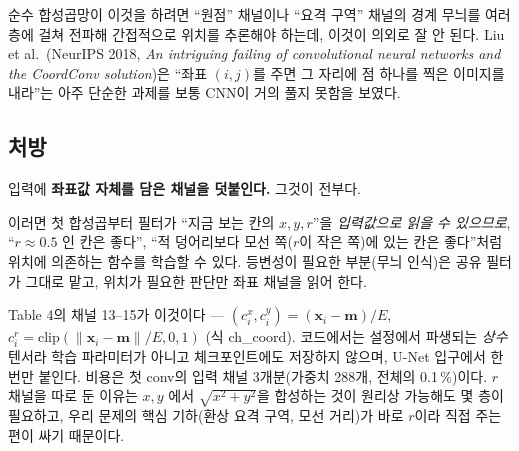 \documentclass[11pt]{article}
\begin{document}
순수 합성곱망이 이것을 하려면 ``원점'' 채널이나 ``요격 구역'' 채널의 경계 무늬를 여러 층에 걸쳐 전파해
간접적으로 위치를 추론해야 하는데, 이것이 의외로 잘 안 된다. Liu et al.\ (NeurIPS 2018, \emph{An intriguing
failing of convolutional neural networks and the CoordConv solution})은 ``좌표 $(i,j)$를 주면 그 자리에 점
하나를 찍은 이미지를 내라''는 아주 단순한 과제를 보통 CNN이 거의 풀지 못함을 보였다.

\subsection*{처방}
입력에 \textbf{좌표값 자체를 담은 채널을 덧붙인다.} 그것이 전부다.

\begin{center}
\end{center}

이러면 첫 합성곱부터 필터가 ``지금 보는 칸의 $x, y, r$''을 \emph{입력값으로 읽을 수 있으므로}, ``$r \approx 0.5$
인 칸은 좋다'', ``적 덩어리보다 모선 쪽($r$이 작은 쪽)에 있는 칸은 좋다''처럼 위치에 의존하는 함수를 학습할
수 있다. 등변성이 필요한 부분(무늬 인식)은 공유 필터가 그대로 맡고, 위치가 필요한 판단만 좌표 채널을
읽어 한다.

\begin{whybox}
Table 4의 채널 13--15가 이것이다 --- $(c^x_i, c^y_i) = (\mathbf{x}_i - \mathbf{m})/E$,
$c^r_i = \mathrm{clip}(\lVert \mathbf{x}_i - \mathbf{m}\rVert / E, 0, 1)$ (식 ch\_coord). 코드에서는 설정에서
파생되는 \emph{상수} 텐서라 학습 파라미터가 아니고 체크포인트에도 저장하지 않으며, U-Net 입구에서 한 번만
붙인다. 비용은 첫 conv의 입력 채널 3개분(가중치 288개, 전체의 0.1\,\%)이다. $r$ 채널을 따로 둔 이유는 $x,y$
에서 $\sqrt{x^2+y^2}$을 합성하는 것이 원리상 가능해도 몇 층이 필요하고, 우리 문제의 핵심 기하(환상 요격 구역,
모선 거리)가 바로 $r$이라 직접 주는 편이 싸기 때문이다.
\end{whybox}
\end{document}
